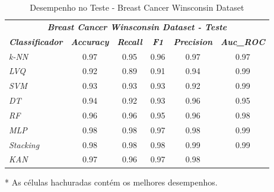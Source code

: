 \documentclass[journal]{IEEEtran}
\begin{document}
\begin{table}[h!]
	\caption{Desempenho no Teste - Breast Cancer Winsconsin Dataset}
	\label{tab:13}
	\begin{threeparttable}
		\begin{tabular}{lccccc}
			\hline
			\multicolumn{6}{c}{\textit{\textbf{Breast Cancer Winsconsin Dataset - Teste}}}                                                                                                                       \\
			\multicolumn{1}{l|}{\textit{\textbf{Classificador}}} & \textit{\textbf{Accuracy}} & \textit{\textbf{Recall}}  & \textit{\textbf{F1}}      & \textit{\textbf{Precision}} & \textit{\textbf{Auc\_ROC}} \\ \hline
			\multicolumn{1}{l|}{\textit{k-NN}}                   & 0.97                       & 0.95                      & 0.96                      & 0.97                        & 0.97                       \\
			\multicolumn{1}{l|}{\textit{LVQ}}                    & 0.92                       & 0.89                      & 0.91                      & 0.94                        & \cellcolor{lightgray}0.99  \\
			\multicolumn{1}{l|}{\textit{SVM}}                    & 0.93                       & 0.93                      & 0.93                      & 0.92                        & \cellcolor{lightgray}0.99  \\
			\multicolumn{1}{l|}{\textit{DT}}                     & 0.94                       & 0.92                      & 0.93                      & 0.96                        & 0.95                       \\
			\multicolumn{1}{l|}{\textit{RF}}                     & 0.96                       & 0.96                      & 0.95                      & 0.96                        & 0.98                       \\
			\multicolumn{1}{l|}{\textit{MLP}}                    & \cellcolor{lightgray}0.98  & \cellcolor{lightgray}0.98 & 0.97                      & 0.98                        & \cellcolor{lightgray}0.99  \\
			\multicolumn{1}{l|}{\textit{Stacking}}               & \cellcolor{lightgray}0.98  & \cellcolor{lightgray}0.98 & \cellcolor{lightgray}0.98 & \cellcolor{lightgray}0.99   & \cellcolor{lightgray}0.99  \\
			\multicolumn{1}{l|}{\textit{KAN}}                    & 0.97                       & 0.96                      & 0.97                      & 0.98                        &                            \\
			\hline
		\end{tabular}
		\begin{tablenotes}\footnotesize
			\item[*] As células hachuradas contém os melhores desempenhos.
		\end{tablenotes}
	\end{threeparttable}
\end{table}
\end{document}
